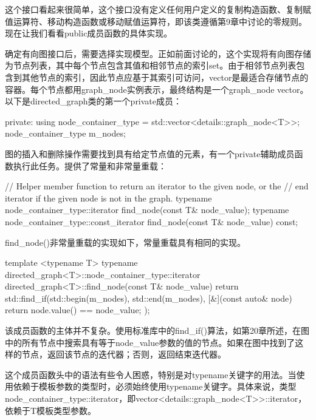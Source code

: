 这个接口看起来很简单，这个接口没有定义任何用户定义的复制构造函数、复制赋值运算符、移动构造函数或移动赋值运算符，即该类遵循第9章中讨论的零规则。现在让我们看看public成员函数的具体实现。


确定有向图接口后，需要选择实现模型。正如前面讨论的，这个实现将有向图存储为节点列表，其中每个节点包含其值和相邻节点的索引set。由于相邻节点列表包含到其他节点的索引，因此节点应基于其索引可访问，vector是最适合存储节点的容器。每个节点都用graph\_node实例表示，最终结构是一个graph\_node vector。以下是directed\_graph类的第一个private成员：

\begin{cpp}
private:
    using node_container_type = std::vector<details::graph_node<T>>;
    node_container_type m_nodes;
\end{cpp}


图的插入和删除操作需要找到具有给定节点值的元素，有一个private辅助成员函数执行此任务。提供了常量和非常量重载：

\begin{cpp}
// Helper member function to return an iterator to the given node, or the
// end iterator if the given node is not in the graph.
typename node_container_type::iterator find_node(const T& node_value);
typename node_container_type::const_iterator find_node(const T& node_value) const;
\end{cpp}

find\_node()非常量重载的实现如下，常量重载具有相同的实现。

\begin{cpp}
template <typename T>
typename directed_graph<T>::node_container_type::iterator
    directed_graph<T>::find_node(const T& node_value)
{
    return std::find_if(std::begin(m_nodes), std::end(m_nodes),
        [&](const auto& node) { return node.value() == node_value; });
}
\end{cpp}

该成员函数的主体并不复杂。使用标准库中的find\_if()算法，如第20章所述，在图中的所有节点中搜索具有等于node\_value参数的值的节点。如果在图中找到了这样的节点，返回该节点的迭代器；否则，返回结束迭代器。

这个成员函数头中的语法有些令人困惑，特别是对typename关键字的用法。当使用依赖于模板参数的类型时，必须始终使用typename关键字。具体来说，类型node\_container\_type::iterator，即vector<details::graph\_node<T>{}>::iterator，依赖于T模板类型参数。


